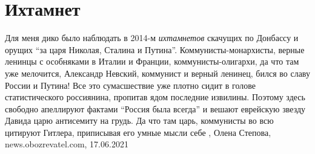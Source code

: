  
 
 
 
 
\chapter{Ихтамнет}
\label{sec:slova.ihtamnet}

Для меня дико было наблюдать в 2014-м \emph{ихтамнетов} скачущих по Донбассу и
орущих \enquote{за царя Николая, Сталина и Путина}. Коммунисты-монархисты,
верные ленинцы с особняками в Италии и Франции, коммунисты-олигархи, да что там
уже мелочится, Александр Невский, коммунист и верный ленинец, бился во славу
России и Путина!  Все это сумасшествие уже плотно сидит в голове
статистического россиянина, пропитав ядом последние извилины. Поэтому здесь
свободно апеллируют фактами \enquote{Россия была всегда} и вешают еврейскую
звезду Давида царю антисемиту на грудь.  Да что там царь, коммунисты во всю
цитируют Гитлера, приписывая его умные мысли себе
, 
Олена Степова, news.obozrevatel.com, 17.06.2021

